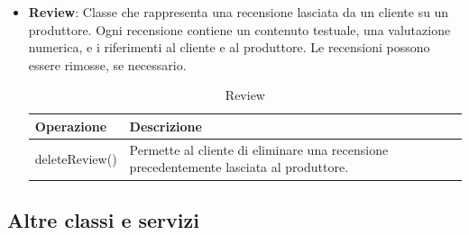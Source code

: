 \begin{itemize}
\item \textbf{Review}:
Classe che rappresenta una recensione lasciata da un cliente su un produttore. Ogni recensione contiene un contenuto testuale, una valutazione numerica, e i riferimenti al cliente e al produttore. Le recensioni possono essere rimosse, se necessario.
\begin{table}[!htbp]
    \centering
    \begin{tabularx}{0.9\textwidth}{ >{\centering\arraybackslash}m{4cm} | X  } 
    \hline
         \textbf{Operazione} & \textbf{Descrizione} \\
         \hline
         deleteReview() & Permette al cliente di eliminare una recensione precedentemente lasciata al produttore. \\
         \hline
    \end{tabularx}
    \caption{Review}
\end{table}

\end{itemize}

\newpage
\subsection{Altre classi e servizi}

